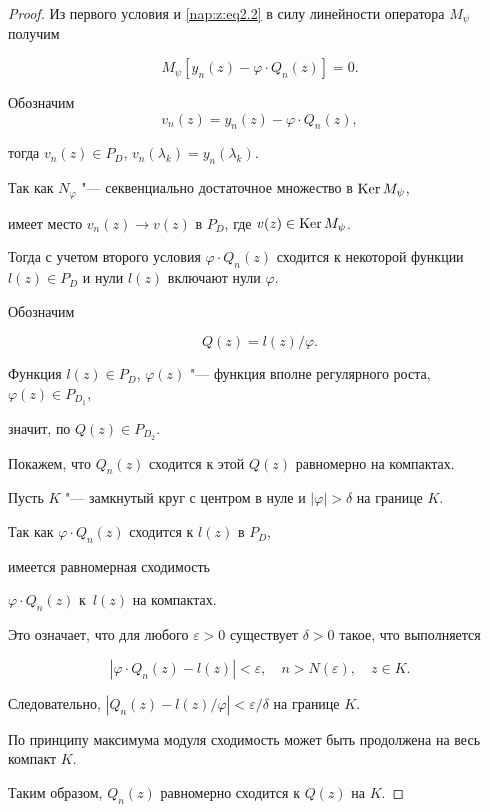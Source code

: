 \begin{proof}
Из первого условия и \eqref{nap:z:eq2.2} в силу линейности оператора $M_\psi$ получим 

$$

M_\psi[y_n(z)-\varphi\cdot Q_n(z)]=0.

$$ 

Обозначим $$v_n(z)=y_n(z)-\varphi\cdot Q_n(z),$$ 

тогда $v_n(z)\in P_D$, $v_n(\lambda_k)=y_n(\lambda_k)$. 

Так как $N_{\varphi}$ "--- секвенциально достаточное множество в $\mathop{\rm Ker} M_\psi$, 

имеет место  $v_n(z)\rightarrow v(z)$ в $P_D$, где $v(z)\in \mathop{\rm Ker} M_\psi$. 

Тогда с учетом второго условия $\varphi \cdot Q_n(z)$ сходится к некоторой функции $l(z)\in P_D$ и нули $l(z)$ включают нули $\varphi$. 

Обозначим 

\[

Q(z)=l(z)/\varphi.

\] 

Функция $l(z)\in P_D$, $\varphi(z)$ "--- функция вполне регулярного роста, $\varphi(z)\in P_{D_1}$, 

значит, по \cite[c.~207]{zabirova1} $Q(z)\in P_{D_2}$. 



Покажем, что $Q_n(z)$ сходится к этой $Q(z)$ равномерно на компактах. 

Пусть $K$ "--- замкнутый круг с центром в нуле и $|\varphi|>\delta$ на границе $K$. 

Так как \mbox{$\varphi\cdot Q_n(z)$} сходится к $l(z)$ в $P_D$, 


имеется равномерная сходимость

$\varphi\cdot Q_n(z)$ к~$l(z)$ на компактах. 

Это означает, что для любого $\varepsilon>0$ существует $\delta>0$ такое, что выполняется 

$$

|\varphi\cdot Q_n(z)-l(z)|<\varepsilon,\quad n>N(\varepsilon),\quad z\in K.

$$ 

Следовательно, $|Q_n(z)-l(z)/\varphi|<\varepsilon /\delta $ на границе $K$. 

По принципу максимума модуля сходимость может быть продолжена на весь компакт $K$. 

Таким образом, $Q_n(z)$ равномерно сходится к $Q(z)$ на $K$. 


\end{proof}
